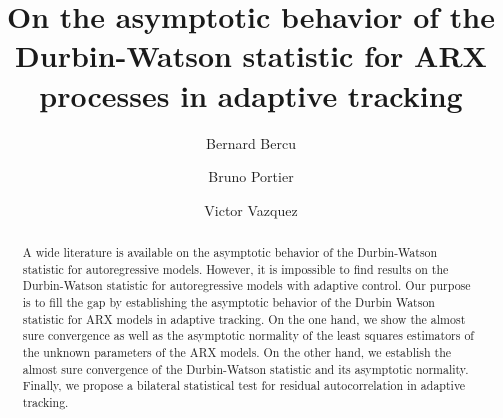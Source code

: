 \documentclass[article,12pt]{amsart}
\numberwithin{equation}{section}
\theoremstyle{plain}
\begin{document}
\title[Asymptotic behavior of the Durbin-Watson statistic for ARX processes]
{On the asymptotic behavior of the Durbin-Watson statistic for ARX processes in adaptive tracking}
\author{Bernard Bercu}
	\address{ Universit\'e Bordeaux 1, Institut de Math\'ematiques de Bordeaux,
	UMR 5251, 351 cours de la lib\'eration, 33405 Talence cedex, France.}

\author{Bruno Portier}
\address{D\'epartement de G\'enie Math\'ematiques, Laboratoire de Math\'ematiques, INSA de Rouen, LMI-EA 3226, place Emile Blondel, BP 08, 76131 Mont-Saint-Aignan cedex, France}

\author{Victor Vazquez}
\address{ Universidad Aut\'onoma de Puebla, Facultad de Ciencias Fisico
Matem\'aticas, Avenida San Claudio y Rio Verde, 72570 Puebla, Mexico.}

\begin{abstract}
A wide literature is available on the asymptotic behavior of the Durbin-Watson statistic for autoregressive models.
However, it is impossible to find results on the Durbin-Watson statistic 
for autoregressive models with adaptive control. Our purpose is to fill the gap by establishing 
the asymptotic behavior of the Durbin Watson statistic for ARX models
in adaptive tracking. On the one hand, we show the almost sure convergence 
as well as the asymptotic normality of the least squares estimators of the unknown
parameters of the ARX models. On the other hand, we establish the almost sure convergence 
of the Durbin-Watson statistic and its asymptotic normality. Finally, we propose a bilateral statistical
test for residual autocorrelation in adaptive tracking.
\end{abstract}

\maketitle
\end{document}
